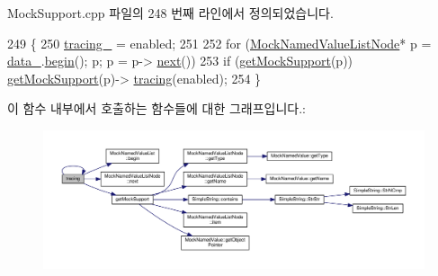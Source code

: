 Mock\+Support.\+cpp 파일의 248 번째 라인에서 정의되었습니다.


\begin{DoxyCode}
249 \{
250     \hyperlink{class_mock_support_a37e443d21e04cf8d6c14d46013cdafdb}{tracing\_} = enabled;
251 
252     \textcolor{keywordflow}{for} (\hyperlink{class_mock_named_value_list_node}{MockNamedValueListNode}* p = \hyperlink{class_mock_support_a26b06d2d43a7804c9aa5808409c0c1ee}{data\_}.\hyperlink{class_mock_named_value_list_a4a5976d05542385eb64ea73eee7fc59c}{begin}(); p; p = p->
      \hyperlink{class_mock_named_value_list_node_adaf0ca3232d35f7efae1bade86b8027e}{next}())
253         \textcolor{keywordflow}{if} (\hyperlink{class_mock_support_a575951d416e49f54fd1a3fc4823609e3}{getMockSupport}(p)) \hyperlink{class_mock_support_a575951d416e49f54fd1a3fc4823609e3}{getMockSupport}(p)->
      \hyperlink{class_mock_support_a4414204b62274c260f6507e97da7fb5e}{tracing}(enabled);
254 \}
\end{DoxyCode}


이 함수 내부에서 호출하는 함수들에 대한 그래프입니다.\+:
\nopagebreak
\begin{figure}[H]
\begin{center}
\leavevmode
\includegraphics[width=350pt]{class_mock_support_a4414204b62274c260f6507e97da7fb5e_cgraph}
\end{center}
\end{figure}




